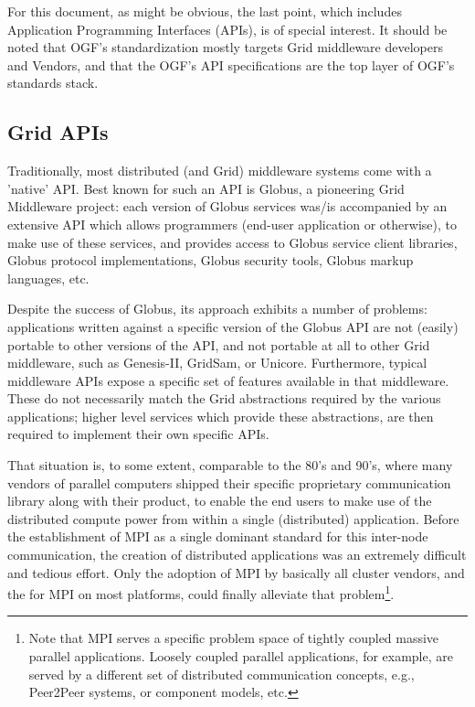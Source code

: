   For this document, as might be obvious, the last point, which includes
  Application Programming Interfaces (APIs), is of special interest.
  It should be noted that OGF's standardization mostly targets Grid
  middleware developers and Vendors, and that the OGF's API specifications
  are the top layer of OGF's standards stack.


 \subsection*{Grid APIs}

  Traditionally, most distributed (and Grid) middleware systems come
  with a 'native' API.  Best known for such an API is Globus, a
  pioneering Grid Middleware project: each version of Globus services was/is
  accompanied by an extensive API which allows programmers (end-user application 
  or otherwise), 
  to make use of these services, and provides access to Globus service client
  libraries, Globus protocol implementations, Globus security tools,
  Globus markup languages, etc.

  Despite the success of Globus, its approach exhibits a number of
  problems: applications written against a specific version of the
  Globus API are not (easily) portable to other versions of the API,
  and not portable at all to other Grid middleware, such as
  Genesis-II, GridSam, or Unicore.  Furthermore, typical middleware
  APIs expose a specific set of features available in that
  middleware. These do not necessarily match the Grid
  abstractions required by the various applications; higher level
  services which provide these abstractions, are then required
  to implement their own specific APIs.
  
  That situation is, to some extent, comparable to the 80's and
  90's, where many vendors of parallel computers shipped their
  specific proprietary communication library along with their
  product, to enable the end users to make use of the distributed
  compute power from within a single (distributed) application.  Before
  the establishment of MPI as a single dominant standard for this
  inter-node communication, the creation of  distributed
  applications was an extremely difficult and tedious effort.  Only
  the adoption of MPI by basically all cluster vendors, and the
   for MPI on most platforms, could finally alleviate
  that problem\footnote{Note that MPI serves a specific problem space
  of tightly coupled massive parallel applications.  Loosely coupled
  parallel applications, for example, are served by a different set of
  distributed communication concepts, e.g., Peer2Peer systems, or
  component models, etc.}.


